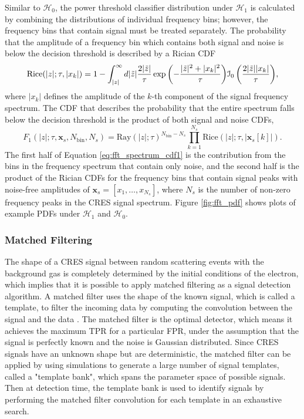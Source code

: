 Similar to $\mathcal{H}_0$, the power threshold classifier distribution under $\mathcal{H}_1$ is calculated by combining the distributions of individual frequency bins; however, the frequency bins that contain signal must be treated separately. The probability that the amplitude of a frequency bin which contains both signal and noise is below the decision threshold is described by a Rician CDF \cite{detection_theory}
\begin{equation}
    \mathrm{Rice}(|z|;\tau, |x_k|)=1-\int_{|z|}^{\infty}{d|\Tilde{z}|\frac{2|\Tilde{z}|}{\tau}\exp{\left(-\frac{|\Tilde{z}|^2+|x_k|^2}{\tau}\right)}\mathcal{I}_0\left(\frac{2|\Tilde{z}||x_k|}{\tau}\right)},
\end{equation}
where $|x_k|$ defines the amplitude of the $k$-th component of the signal frequency spectrum. The CDF that describes the probability that the entire spectrum falls below the decision threshold is the product of both signal and noise CDFs,
\begin{equation}
    F_1(|z|;\tau, \mathbf{x}_s, N_\mathrm{bin}, N_s)=\mathrm{Ray}(|z|;\tau)^{N_\mathrm{bin}-N_s}\prod_{k=1}^{N_s}{\mathrm{Rice}(|z|;\tau, \left|\mathbf{x}_s[k]\right|)}.
    \label{eq:fft_spectrum_cdf1}
\end{equation}
The first half of Equation \ref{eq:fft_spectrum_cdf1} is the contribution from the bins in the frequency spectrum that contain only noise, and the second half is the product of the Rician CDFs for the frequency bins that contain signal peaks with noise-free amplitudes of $\mathbf{x}_s=\left[x_1,\ldots, x_{N_s}\right]$, where $N_s$ is the number of non-zero frequency peaks in the CRES signal spectrum. Figure \ref{fig:fft_pdf} shows plots of example PDFs under $\mathcal{H}_1$ and $\mathcal{H}_0$.

\subsubsection{Matched Filtering}

\label{sec:classifiers-mf}

The shape of a CRES signal between random scattering events with the background gas is completely determined by the initial conditions of the electron, which implies that it is possible to apply matched filtering as a signal detection algorithm. A matched filter uses the shape of the known signal, which is called a template, to filter the incoming data by computing the convolution between the signal and the data \cite{detection_theory}. The matched filter is the optimal detector, which means it achieves the maximum TPR for a particular FPR, under the assumption that the signal is perfectly known and the noise is Gaussian distributed. Since CRES signals have an unknown shape but are deterministic, the matched filter can be applied by using simulations to generate a large number of signal templates, called a "template bank", which spans the parameter space of possible signals. Then at detection time, the template bank is used to identify signals by performing the matched filter convolution for each template in an exhaustive search.

